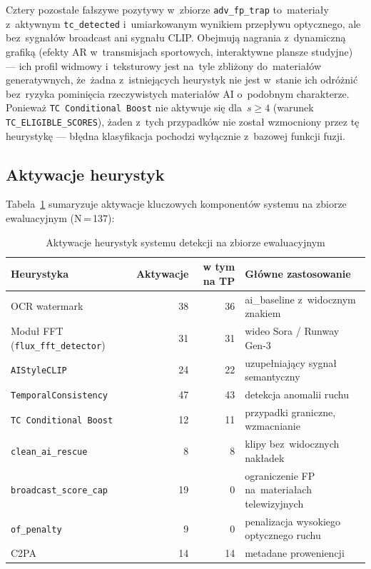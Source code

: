Cztery pozostałe fałszywe pozytywy w~zbiorze \texttt{adv\_fp\_trap}
to~materiały z~aktywnym \texttt{tc\_detected} i~umiarkowanym wynikiem
przepływu optycznego, ale bez~sygnałów broadcast ani sygnału CLIP.
Obejmują nagrania z~dynamiczną grafiką (efekty AR w~transmisjach sportowych,
interaktywne plansze studyjne) --- ich profil widmowy i~teksturowy
jest na~tyle zbliżony do~materiałów generatywnych,
że~żadna z~istniejących heurystyk nie jest w~stanie ich odróżnić
bez~ryzyka pominięcia rzeczywistych materiałów AI o~podobnym charakterze.
Ponieważ \texttt{TC Conditional Boost} nie aktywuje się dla~$s \geq 4$
(warunek \texttt{TC\_ELIGIBLE\_SCORES}), żaden z~tych przypadków
nie został wzmocniony przez tę heurystykę ---
błędna klasyfikacja pochodzi wyłącznie z~bazowej funkcji fuzji.

\subsection*{Aktywacje heurystyk}

Tabela~\ref{tab:heuristics} sumaryzuje aktywacje kluczowych komponentów systemu
na zbiorze ewaluacyjnym (N\,=\,137):

\begin{table}[h]
\centering
\caption{Aktywacje heurystyk systemu detekcji na zbiorze ewaluacyjnym}
\label{tab:heuristics}
\begin{tabular}{lrrl}
\toprule
Heurystyka & Aktywacje & w tym na TP & Główne zastosowanie \\
\midrule
OCR watermark & 38 & 36 & ai\_baseline z~widocznym znakiem \\
Moduł FFT (\texttt{flux\_fft\_detector}) & 31 & 31 & wideo Sora / Runway Gen-3 \\
\texttt{AIStyleCLIP} & 24 & 22 & uzupełniający sygnał semantyczny \\
\texttt{TemporalConsistency} & 47 & 43 & detekcja anomalii ruchu \\
\texttt{TC Conditional Boost} & 12 & 11 & przypadki graniczne, wzmacnianie \\
\texttt{clean\_ai\_rescue} & 8 & 8 & klipy bez~widocznych nakładek \\
\texttt{broadcast\_score\_cap} & 19 & 0 & ograniczenie FP na~materiałach telewizyjnych \\
\texttt{of\_penalty} & 9 & 0 & penalizacja wysokiego optycznego ruchu \\
C2PA & 14 & 14 & metadane proweniencji \\
\bottomrule
\end{tabular}
\end{table}

